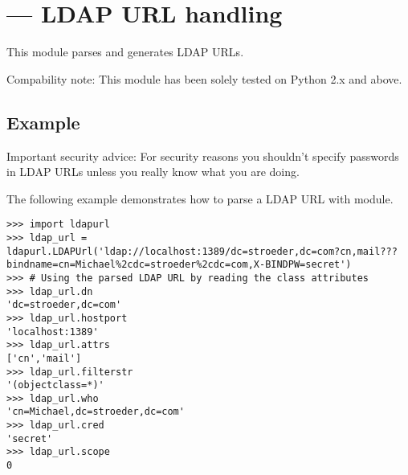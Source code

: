 

\section{ ---
         LDAP URL handling}






This module parses and generates LDAP URLs.

Compability note: This module has been solely tested on Python 2.x and above.

\begin{seealso}
\end{seealso}

\subsection{Example \label{ldapurl-example}}

Important security advice:
For security reasons you shouldn't specify passwords in LDAP URLs
unless you really know what you are doing.

The following example demonstrates how to parse a LDAP URL
with  module.

\begin{verbatim}
>>> import ldapurl
>>> ldap_url = ldapurl.LDAPUrl('ldap://localhost:1389/dc=stroeder,dc=com?cn,mail???bindname=cn=Michael%2cdc=stroeder%2cdc=com,X-BINDPW=secret')
>>> # Using the parsed LDAP URL by reading the class attributes
>>> ldap_url.dn
'dc=stroeder,dc=com'
>>> ldap_url.hostport
'localhost:1389'
>>> ldap_url.attrs
['cn','mail']
>>> ldap_url.filterstr
'(objectclass=*)'
>>> ldap_url.who
'cn=Michael,dc=stroeder,dc=com'
>>> ldap_url.cred
'secret'
>>> ldap_url.scope
0
\end{verbatim}

